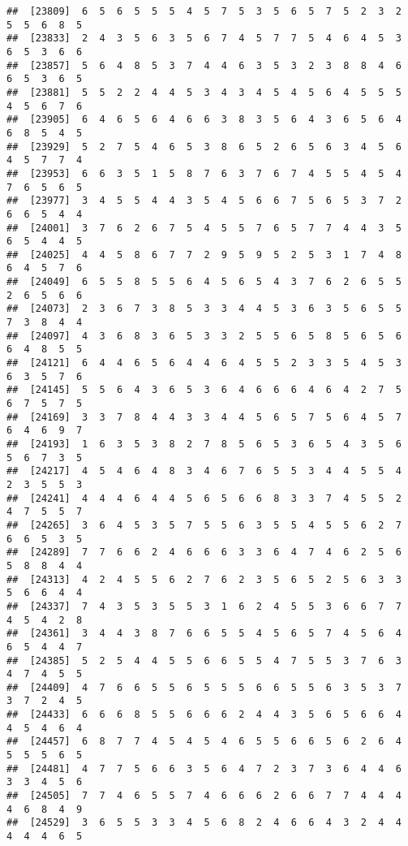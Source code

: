 \documentclass[
]{book}
\begin{document}
\begin{verbatim}
##  [23809]  6  5  6  5  5  5  4  5  7  5  3  5  6  5  7  5  2  3  2  5  5  6  8  5
##  [23833]  2  4  3  5  6  3  5  6  7  4  5  7  7  5  4  6  4  5  3  6  5  3  6  6
##  [23857]  5  6  4  8  5  3  7  4  4  6  3  5  3  2  3  8  8  4  6  6  5  3  6  5
##  [23881]  5  5  2  2  4  4  5  3  4  3  4  5  4  5  6  4  5  5  5  4  5  6  7  6
##  [23905]  6  4  6  5  6  4  6  6  3  8  3  5  6  4  3  6  5  6  4  6  8  5  4  5
##  [23929]  5  2  7  5  4  6  5  3  8  6  5  2  6  5  6  3  4  5  6  4  5  7  7  4
##  [23953]  6  6  3  5  1  5  8  7  6  3  7  6  7  4  5  5  4  5  4  7  6  5  6  5
##  [23977]  3  4  5  5  4  4  3  5  4  5  6  6  7  5  6  5  3  7  2  6  6  5  4  4
##  [24001]  3  7  6  2  6  7  5  4  5  5  7  6  5  7  7  4  4  3  5  6  5  4  4  5
##  [24025]  4  4  5  8  6  7  7  2  9  5  9  5  2  5  3  1  7  4  8  6  4  5  7  6
##  [24049]  6  5  5  8  5  5  6  4  5  6  5  4  3  7  6  2  6  5  5  2  6  5  6  6
##  [24073]  2  3  6  7  3  8  5  3  3  4  4  5  3  6  3  5  6  5  5  7  3  8  4  4
##  [24097]  4  3  6  8  3  6  5  3  3  2  5  5  6  5  8  5  6  5  6  6  4  8  5  5
##  [24121]  6  4  4  6  5  6  4  4  6  4  5  5  2  3  3  5  4  5  3  6  3  5  7  6
##  [24145]  5  5  6  4  3  6  5  3  6  4  6  6  6  4  6  4  2  7  5  6  7  5  7  5
##  [24169]  3  3  7  8  4  4  3  3  4  4  5  6  5  7  5  6  4  5  7  6  4  6  9  7
##  [24193]  1  6  3  5  3  8  2  7  8  5  6  5  3  6  5  4  3  5  6  5  6  7  3  5
##  [24217]  4  5  4  6  4  8  3  4  6  7  6  5  5  3  4  4  5  5  4  2  3  5  5  3
##  [24241]  4  4  4  6  4  4  5  6  5  6  6  8  3  3  7  4  5  5  2  4  7  5  5  7
##  [24265]  3  6  4  5  3  5  7  5  5  6  3  5  5  4  5  5  6  2  7  6  6  5  3  5
##  [24289]  7  7  6  6  2  4  6  6  6  3  3  6  4  7  4  6  2  5  6  5  8  8  4  4
##  [24313]  4  2  4  5  5  6  2  7  6  2  3  5  6  5  2  5  6  3  3  5  6  6  4  4
##  [24337]  7  4  3  5  3  5  5  3  1  6  2  4  5  5  3  6  6  7  7  4  5  4  2  8
##  [24361]  3  4  4  3  8  7  6  6  5  5  4  5  6  5  7  4  5  6  4  6  5  4  4  7
##  [24385]  5  2  5  4  4  5  5  6  6  5  5  4  7  5  5  3  7  6  3  4  7  4  5  5
##  [24409]  4  7  6  6  5  5  6  5  5  5  6  6  5  5  6  3  5  3  7  3  7  2  4  5
##  [24433]  6  6  6  8  5  5  6  6  6  2  4  4  3  5  6  5  6  6  4  4  5  4  6  4
##  [24457]  6  8  7  7  4  5  4  5  4  6  5  5  6  6  5  6  2  6  4  5  5  5  6  5
##  [24481]  4  7  7  5  6  6  3  5  6  4  7  2  3  7  3  6  4  4  6  3  3  4  5  6
##  [24505]  7  7  4  6  5  5  7  4  6  6  6  2  6  6  7  7  4  4  4  4  6  8  4  9
##  [24529]  3  6  5  5  3  3  4  5  6  8  2  4  6  6  4  3  2  4  4  4  4  4  6  5

\end{verbatim}
\end{document}
